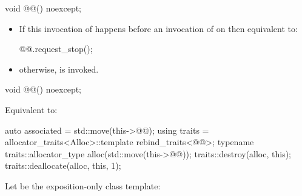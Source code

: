 %
\begin{itemdecl}
void @@() noexcept;
\end{itemdecl}

\begin{itemdescr}
\pnum
\effects
\begin{itemize}
\item
If this invocation of  happens before
an invocation of  on  then
equivalent to:
\begin{codeblock}
@@.request_stop();
\end{codeblock}
\item
otherwise,
 is invoked.
\end{itemize}
\end{itemdescr}

%
\begin{itemdecl}
void @@() noexcept;
\end{itemdecl}

\begin{itemdescr}
\pnum
\effects
Equivalent to:
\begin{codeblock}
auto associated = std::move(this->@@);
{
  using traits = allocator_traits<Alloc>::template rebind_traits<@@>;
  typename traits::allocator_type alloc(std::move(this->@@));
  traits::destroy(alloc, this);
  traits::deallocate(alloc, this, 1);
}
\end{codeblock}
\end{itemdescr}

\pnum
Let  be the exposition-only class template:

